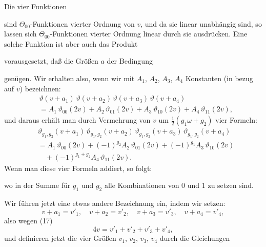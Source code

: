 
Die vier Funktionen

sind $\Theta_{00}$-Funktionen vierter Ordnung von $v$, und da sie linear unabhängig sind, so lassen sich  $\Theta_{00}$-Funktionen vierter Ordnung linear durch sie ausdrücken. Eine solche Funktion ist aber auch das Produkt

vorausgesetzt, daß die Größen $a$ der Bedingung

genügen. Wir erhalten also, wenn wir mit $A_1$, $A_2$, $A_3$, $A_4$ Konstanten (in bezug auf $v$) bezeichnen:
\[
\begin{aligned}
&\vartheta(v+a_1)\,\vartheta(v+a_2)\,\vartheta(v+a_3)\,\vartheta(v+a_4) \\
&{}= A_1\,\vartheta_{00}(2v) + A_2\,\vartheta_{01}(2v) + A_3\,\vartheta_{10}(2v) + A_4\,\vartheta_{11}(2v),
\end{aligned}
\]
und daraus erhält man durch Vermehrung von $v$ um $\frac{1}{2}(g_1\omega+g_2)$ vier Formeln:
\[
\begin{aligned}
&\vartheta_{g_1,g_2}(v+a_1)\,\vartheta_{g_1,g_2}(v+a_2)\,\vartheta_{g_1,g_2}(v+a_3)\,\vartheta_{g_1,g_2}(v+a_4) \\
&{}= A_1\,\vartheta_{00}(2v) + (-1)^{g_2}A_2\,\vartheta_{01}(2v) + (-1)^{g_1}A_3\,\vartheta_{10}(2v) \\
&\quad{}+ (-1)^{g_1+g_2}A_4\,\vartheta_{11}(2v).
\end{aligned}
\]
Wenn man diese vier Formeln addiert, so folgt:

wo in der Summe für $g_1$ und $g_2$ alle Kombinationen von 0 und 1 zu setzen sind.

Wir führen jetzt eine etwas andere Bezeichnung ein, indem wir setzen:
\[
v+a_1 = v'_1, \quad v+a_2 = v'_2, \quad v+a_3 = v'_3, \quad v+a_4 = v'_4,
\]
also wegen (17)
\[
4v = v'_1 + v'_2 + v'_3 + v'_4,
\]
und definieren jetzt die vier Größen $v_1$, $v_2$, $v_3$, $v_4$ durch die Gleichungen

